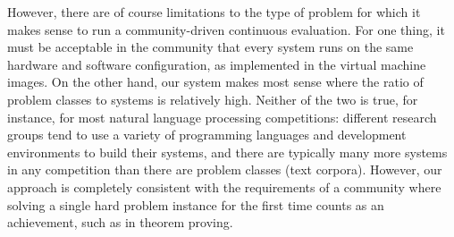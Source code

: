 However, there are of course limitations to the type of problem for
which it makes sense to run a community-driven continuous evaluation.
For one thing, it must be acceptable in the community that every
system runs on the same hardware and software configuration, as
implemented in the virtual machine images.  On the other hand, our
system makes most sense where the ratio of problem classes to systems
is relatively high.  Neither of the two is true, for instance, for
most natural language processing competitions: different research
groups tend to use a variety of programming languages and development
environments to build their systems, and there are typically many more
systems in any competition than there are problem classes (text corpora).
However, our approach is completely consistent with the requirements
of a community where solving a single hard problem instance for the
first time counts as an achievement, such as in theorem proving.




